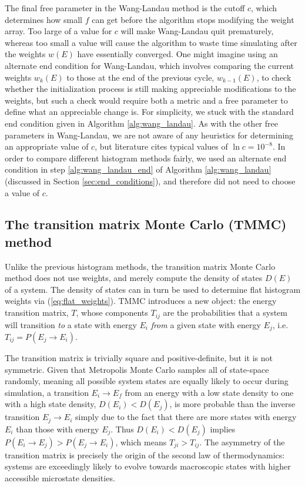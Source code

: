 \documentclass[11pt]{article}
\newcommand{\p}[1]{\left(#1\right)} %
\begin{document}
The final free parameter in the Wang-Landau method is the cutoff $c$,
which determines how small $f$ can get before the algorithm stops
modifying the weight array. Too large of a value for $c$ will make
Wang-Landau quit prematurely, whereas too small a value will cause the
algorithm to waste time simulating after the weights $w\p{E}$ have
essentially converged. One might imagine using an alternate end
condition for Wang-Landau, which involves comparing the current
weights $w_k\p{E}$ to those at the end of the previous cycle,
$w_{k-1}\p{E}$, to check whether the initialization process is still
making appreciable modifications to the weights, but such a check
would require both a metric and a free parameter to define what an
appreciable change is. For simplicity, we stuck with the standard end
condition given in Algorithm \ref{alg:wang_landau}. As with the other
free parameters in Wang-Landau, we are not aware of any heuristics for
determining an appropriate value of $c$, but literature cites typical
values of $\ln c=10^{-8}$. In order to compare different histogram
methods fairly, we used an alternate end condition in step
\ref{alg:wang_landau_end} of Algorithm \ref{alg:wang_landau}
(discussed in Section \ref{sec:end_conditions}), and therefore did not
need to choose a value of $c$.

\subsection{The transition matrix Monte Carlo (TMMC) method}
\label{sec:tmmc}

Unlike the previous histogram methods, the transition matrix Monte
Carlo method does not use weights, and merely compute the density of
states $D\p{E}$ of a system\cite{tmmc}. The density of states can in
turn be used to determine flat histogram weights via
(\ref{eq:flat_weights}). TMMC introduces a new object: the energy
transition matrix, $T$, whose components $T_{ij}$ are the
probabilities that a system will transition {\it to} a state with
energy $E_i$ {\it from} a given state with energy $E_j$,
i.e. $T_{ij}=P\p{E_j\to E_i}$.

The transition matrix is trivially square and positive-definite, but
it is not symmetric. Given that Metropolis Monte Carlo samples all of
state-space randomly, meaning all possible system states are equally
likely to occur during simulation, a transition $E_i\to E_f$ from an
energy with a low state density to one with a high state density,
$D\p{E_i}<D\p{E_j}$, is more probable than the inverse transition
$E_j\to E_i$ simply due to the fact that there are more states with
energy $E_i$ than those with energy $E_j$. Thus $D\p{E_i}<D\p{E_j}$
implies $P\p{E_i\to E_j}>P\p{E_j\to E_i}$, which means
$T_{ji}>T_{ij}$. The asymmetry of the transition matrix is precisely
the origin of the second law of thermodynamics: systems are
exceedingly likely to evolve towards macroscopic states with higher
accessible microstate densities.
\end{document}

